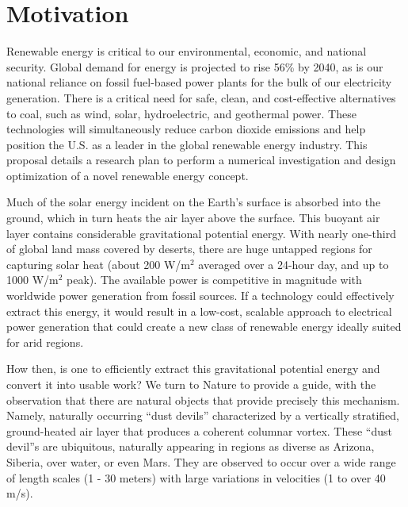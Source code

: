 \label{sec:intro}

%
%


\section{Motivation}

Renewable energy is critical to our environmental, economic, and
national security. Global demand for energy is projected to rise 56\% by
2040\cite{energy-outlook}, as is our national reliance on fossil
fuel-based power plants for the bulk of our electricity generation. 
There is a critical need for safe, clean, and
cost-effective alternatives to coal, such as wind, solar, hydroelectric,
and geothermal power. These technologies will simultaneously reduce
carbon dioxide emissions and help position the U.S. as a leader in the
global renewable energy industry. 
%
This proposal details a research plan to perform a numerical
investigation and design optimization of a novel renewable energy concept. 

Much of the solar energy incident on the Earth's surface is absorbed
into the ground, which in turn heats the air layer above the surface.
This buoyant air layer contains considerable gravitational potential
energy. 
With nearly one-third of global land mass covered by deserts, there are huge
untapped regions for capturing solar heat (about 200 W/$\text{m}^2$
averaged over a 24-hour day, and up to 1000 W/$\text{m}^2$
peak)\cite{Hoyt197827}. The available power is competitive in magnitude
with worldwide power generation from fossil sources. If a technology
could effectively extract this energy, it would result in a low-cost,
scalable approach to electrical power generation that could create a new
class of renewable energy ideally suited for arid regions.  

How then, is one to efficiently extract this gravitational potential
energy and convert it into usable work? We turn to Nature to provide a 
guide, with the observation that there are natural objects that provide
precisely this mechanism. Namely, naturally occurring ``dust devils'' 
characterized by a vertically stratified, ground-heated air layer
that produces a coherent columnar vortex. These ``dust devil''s are
ubiquitous, naturally appearing in regions as diverse as Arizona,
Siberia, over water, or even
Mars\cite{Sinclair1969,ROG:ROG1635,JGRE:JGRE1660}.  
They are observed to occur over a wide range of length scales (1 - 30
meters) with large variations in velocities (1 to over 40
m/s)\cite{Sinclair1969}. 

